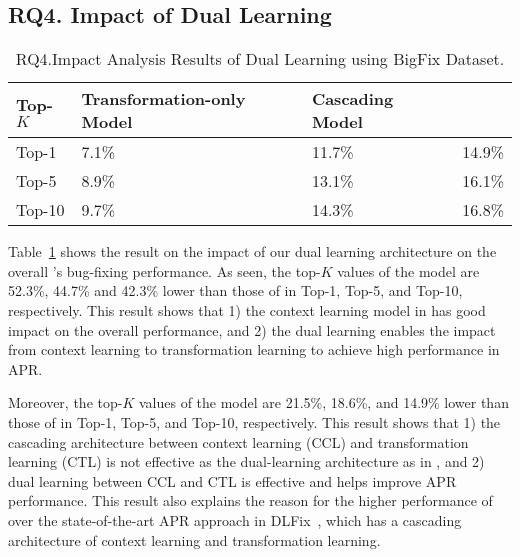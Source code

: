 \subsection{\bf RQ4. Impact of Dual Learning}



\begin{table}[t]
  \caption{RQ4.Impact Analysis Results of Dual Learning using BigFix Dataset.}
  \vspace{-6pt}
	{\small
		\begin{center}
			\renewcommand{\arraystretch}{1}
			\begin{tabular}{p{1cm}<{\centering}|p{2.7cm}<{\centering}|p{1.7cm}<{\centering}|p{1cm}<{\centering}}
				\hline
				Top-$K$ & Transformation-only Model & Cascading Model &  \tool \\			
				\hline
				Top-1   & 7.1\% & 11.7\% & 14.9\% \\ \hline
				Top-5	& 8.9\% & 13.1\% & 16.1\% \\ \hline
				Top-10	& 9.7\% & 14.3\% & 16.8\%\\ \hline
			
				\hline
			\end{tabular}
			\label{fig:rq4_results}
		\end{center}
	}
\end{table}

Table~\ref{fig:rq4_results} shows the result on the impact of our dual
learning architecture on the overall {\tool}'s bug-fixing performance.
As seen, the top-$K$ values of the  model
are 52.3\%, 44.7\% and 42.3\% lower than those of {\tool} in Top-1,
Top-5, and Top-10, respectively. This result shows that 1) the context
learning model in {\tool} has good impact on the overall performance,
and 2) the dual learning enables the impact from context learning to
transformation learning to achieve high performance in APR.

Moreover, the top-$K$ values of the  model are 21.5\%,
18.6\%, and 14.9\% lower than those of {\tool} in Top-1, Top-5, and
Top-10, respectively. This result shows that 1) the cascading
architecture between context learning (CCL) and transformation
learning (CTL) is not effective as the dual-learning architecture as
in {\tool}, and 2) dual learning between CCL and CTL is effective and
helps improve APR performance. This result also explains the reason
for the higher performance of {\tool} over the state-of-the-art APR
approach in DLFix~\cite{icse20}, which has a cascading architecture of
context learning and transformation learning.



